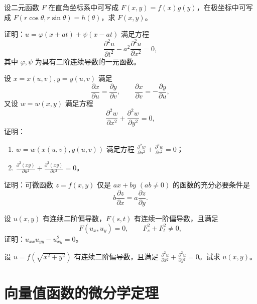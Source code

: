 \begin{xexercise}[10]
设二元函数 $F$ 在直角坐标系中可写成 $F(x,y)=f(x)g(y)$，在极坐标中可写成 $F(r\cos\theta,r\sin\theta)=h(\theta)$，求 $F(x,y)$。
\end{xexercise}

\begin{xexercise}[11]
证明：$u=\varphi(x+at)+\psi(x-at)$ 满足方程
  \[
    \frac{\partial^2u}{\partial t^2}-a^2\frac{\partial^2u}{\partial x^2}=0,
  \]
  其中 $\varphi,\psi$ 为具有二阶连续导数的一元函数。
\end{xexercise}

\begin{xexercise}[12]
设 $x=x(u,v),y=y(u,v)$ 满足
  \[
    \frac{\partial x}{\partial u}=\frac{\partial y}{\partial v},
    \qquad
    \frac{\partial x}{\partial v}=-\frac{\partial y}{\partial u},
  \]
  又设 $w=w(x,y)$ 满足方程
  \[
    \frac{\partial^2w}{\partial x^2}+\frac{\partial^2w}{\partial y^2}=0,
  \]
  证明：
  \begin{enumerate}[label=(\arabic*)]
    \item $w=w(x(u,v),y(u,v))$ 满足方程 $\frac{\partial^2w}{\partial u^2}+\frac{\partial^2w}{\partial v^2}=0$；
    \item $\frac{\partial^2(xy)}{\partial u^2}+\frac{\partial^2(xy)}{\partial v^2}=0$。
  \end{enumerate}
\end{xexercise}

\begin{xexercise}[13]
证明：可微函数 $z=f(x,y)$ 仅是 $ax+by$ $(ab\ne0)$ 的函数的充分必要条件是
  \[
    b\frac{\partial z}{\partial x}=a\frac{\partial z}{\partial y}.
  \]
\end{xexercise}

\begin{xexercise}[14]
设 $u(x,y)$ 有连续二阶偏导数，$F(s,t)$ 有连续一阶偏导数，且满足
  \[
    F(u_x,u_y)=0,\qquad F_s^2+F_t^2\ne0,
  \]
  证明：$u_{xx}u_{yy}-u_{xy}^2=0$。
\end{xexercise}

\begin{xexercise}[15]
设 $u=f(\sqrt{x^2+y^2})$ 有连续二阶偏导数，且满足 $\frac{\partial^2u}{\partial x^2}+\frac{\partial^2u}{\partial y^2}=0$。试求 $u(x,y)$。
\end{xexercise}

\section{向量值函数的微分学定理}

